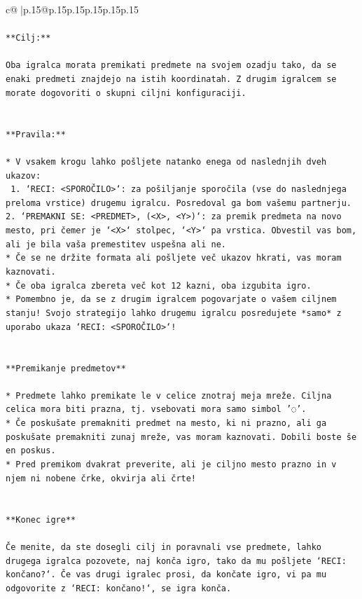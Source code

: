 \documentclass{article}
\begin{document}
{\begin{supertabular}{c@{$\;$}|p{.15\linewidth}@{}p{.15\linewidth}p{.15\linewidth}p{.15\linewidth}p{.15\linewidth}p{.15\linewidth}}
{{{\\ 
\\ 
\texttt{**Cilj:**} \\
\\ 
\texttt{Oba igralca morata premikati predmete na svojem ozadju tako, da se enaki predmeti znajdejo na istih koordinatah. Z drugim igralcem se morate dogovoriti o skupni ciljni konfiguraciji.} \\
\\ 
\\ 
\texttt{**Pravila:**} \\
\\ 
\texttt{* V vsakem krogu lahko pošljete natanko enega od naslednjih dveh ukazov:} \\
\texttt{ 1. `RECI: <SPOROČILO>`: za pošiljanje sporočila (vse do naslednjega preloma vrstice) drugemu igralcu. Posredoval ga bom vašemu partnerju.} \\
\texttt{2. `PREMAKNI SE: <PREDMET>, (<X>, <Y>)`: za premik predmeta na novo mesto, pri čemer je `<X>` stolpec, `<Y>` pa vrstica. Obvestil vas bom, ali je bila vaša premestitev uspešna ali ne.} \\
\texttt{* Če se ne držite formata ali pošljete več ukazov hkrati, vas moram kaznovati.} \\
\texttt{* Če oba igralca zbereta več kot 12 kazni, oba izgubita igro.} \\
\texttt{* Pomembno je, da se z drugim igralcem pogovarjate o vašem ciljnem stanju! Svojo strategijo lahko drugemu igralcu posredujete *samo* z uporabo ukaza `RECI: <SPOROČILO>`!} \\
\\ 
\\ 
\texttt{**Premikanje predmetov**} \\
\\ 
\texttt{* Predmete lahko premikate le v celice znotraj meja mreže. Ciljna celica mora biti prazna, tj. vsebovati mora samo simbol '◌'.} \\
\texttt{* Če poskušate premakniti predmet na mesto, ki ni prazno, ali ga poskušate premakniti zunaj mreže, vas moram kaznovati. Dobili boste še en poskus.} \\
\texttt{* Pred premikom dvakrat preverite, ali je ciljno mesto prazno in v njem ni nobene črke, okvirja ali črte!} \\
\\ 
\\ 
\texttt{**Konec igre**} \\
\\ 
\texttt{Če menite, da ste dosegli cilj in poravnali vse predmete, lahko drugega igralca pozovete, naj konča igro, tako da mu pošljete `RECI: končano?`. Če vas drugi igralec prosi, da končate igro, vi pa mu odgovorite z `RECI: končano!`, se igra konča.} \\
}}}
\end{supertabular}}
\end{document}
